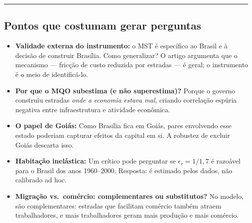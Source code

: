\documentclass[12pt, a4paper]{article}
\begin{document}
\vspace{0.5cm}
\hrule
\vspace{0.3cm}

\subsection*{Pontos que costumam gerar perguntas}

\begin{itemize}
    \item \textbf{Validade externa do instrumento:} o MST é específico ao Brasil e à decisão de construir Brasília. Como generalizar? O artigo argumenta que o mecanismo --- fricção de custo reduzida por estradas --- é geral; o instrumento é o meio de identificá-lo.
    \item \textbf{Por que o MQO subestima (e não superestima)?} Porque o governo construiu estradas \textit{onde a economia estava mal}, criando correlação espúria negativa entre infraestrutura e atividade econômica.
    \item \textbf{O papel de Goiás:} Como Brasília fica em Goiás, pares envolvendo esse estado poderiam capturar efeitos da capital em si. A robustez de excluir Goiás descarta isso.
    \item \textbf{Habitação inelástica:} Um crítico pode perguntar se $\epsilon_r = 1/1{,}7$ é razoável para o Brasil dos anos 1960--2000. Resposta: é estimado pelos dados, não calibrado ad hoc.
    \item \textbf{Migração vs.\ comércio: complementares ou substitutos?} No modelo, são complementares: estradas que facilitam comércio também atraem trabalhadores, e mais trabalhadores geram mais produção e mais comércio.
\end{itemize}
\end{document}
